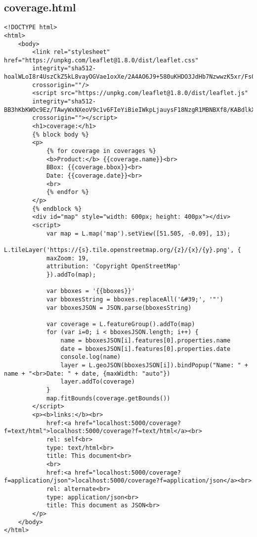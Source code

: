 \subsection{coverage.html}
\begin{lstlisting}[caption={coverage.html}, style = HTML]
<!DOCTYPE html>
<html>
	<body>
		<link rel="stylesheet" href="https://unpkg.com/leaflet@1.8.0/dist/leaflet.css"
		integrity="sha512-hoalWLoI8r4UszCkZ5kL8vayOGVae1oxXe/2A4AO6J9+580uKHDO3JdHb7NzwwzK5xr/Fs0W40kiNHxM9vyTtQ=="
		crossorigin=""/>
		<script src="https://unpkg.com/leaflet@1.8.0/dist/leaflet.js"
		integrity="sha512-BB3hKbKWOc9Ez/TAwyWxNXeoV9c1v6FIeYiBieIWkpLjauysF18NzgR1MBNBXf8/KABdlkX68nAhlwcDFLGPCQ=="
		crossorigin=""></script>
		<h1>coverage:</h1>
		{% block body %}
		<p>
            {% for coverage in coverages %}
            <b>Product:</b> {{coverage.name}}<br>
			BBox: {{coverage.bbox}}<br>
			Date: {{coverage.date}}<br>
			<br>
            {% endfor %}
		</p>
    	{% endblock %}
		<div id="map" style="width: 600px; height: 400px"></div>
		<script>
			var map = L.map('map').setView([51.505, -0.09], 13);
			L.tileLayer('https://{s}.tile.openstreetmap.org/{z}/{x}/{y}.png', {
			maxZoom: 19,
			attribution: 'Copyright OpenStreetMap'
			}).addTo(map);
			
			var bboxes = '{{bboxes}}'
			var bboxesString = bboxes.replaceAll('&#39;', '"')
			var bboxesJSON = JSON.parse(bboxesString)
			
			var coverage = L.featureGroup().addTo(map)
			for (var i=0; i < bboxesJSON.length; i++) {
				name = bboxesJSON[i].features[0].properties.name
				date = bboxesJSON[i].features[0].properties.date
				console.log(name)
				layer = L.geoJSON(bboxesJSON[i]).bindPopup("Name: " + name + "<br>Date: " + date, {maxWidth: "auto"})
				layer.addTo(coverage)
			}
			map.fitBounds(coverage.getBounds())
		</script>
		<p><b>links:</b><br>
			href:<a href="localhost:5000/coverage?f=text/html">localhost:5000/coverage?f=text/html</a><br>
			rel: self<br>
			type: text/html<br>
			title: This document<br>
			<br>
			href:<a href="localhost:5000/coverage?f=application/json">localhost:5000/coverage?f=application/json</a><br>
			rel: alternate<br>
			type: application/json<br>
			title: This document as JSON<br>
		</p>
	</body>
</html>
\end{lstlisting}\label{RessourceCoveragesHTML}  